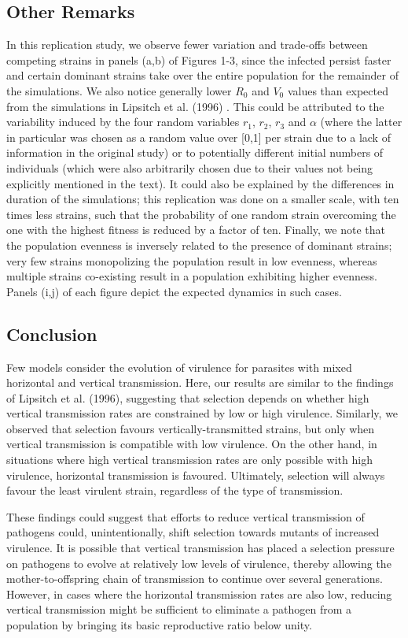 \subsection{Other Remarks}
In this replication study, we observe fewer variation and trade-offs between
competing strains in panels (a,b) of Figures 1-3, since the infected persist
faster and certain dominant strains take over the entire population for the
remainder of the simulations. We also notice generally lower $R_0$ and $V_0$
values than expected from the simulations in Lipsitch et al. (1996)
\supercite{Lipsitch:1996}. This could be attributed to the variability induced
by the four random variables $r_1$, $r_2$, $r_3$ and $\alpha$ (where the latter
in particular was chosen as a random value over [0,1] per strain due to a lack
of information in the original study) or to potentially different initial
numbers of individuals (which were also arbitrarily chosen due to their values
not being explicitly mentioned in the text). It could also be explained by the
differences in duration of the simulations; this replication was done on a
smaller scale, with ten times less strains, such that the probability of one
random strain overcoming the one with the highest fitness is reduced by a
factor of ten. Finally, we note that the population evenness is inversely
related to the presence of dominant strains; very few strains monopolizing the
population result in low evenness, whereas multiple strains co-existing result
in a population exhibiting higher evenness. Panels (i,j) of each figure depict
the expected dynamics in such cases.

\subsection{Conclusion}
Few models consider the evolution of virulence for parasites with mixed
horizontal and vertical transmission. Here, our results are similar to the
findings of Lipsitch et al. (1996)\supercite{Lipsitch:1996}, suggesting that
selection depends on whether high vertical transmission rates are constrained
by low or high virulence. Similarly, we observed that selection favours
vertically-transmitted strains, but only when vertical transmission is
compatible with low virulence. On the other hand, in situations where high
vertical transmission rates are only possible with high virulence, horizontal
transmission is favoured. Ultimately, selection will always favour the least
virulent strain, regardless of the type of transmission.

These findings could suggest that efforts to reduce vertical transmission of
pathogens could, unintentionally, shift selection towards mutants of increased
virulence. It is possible that vertical transmission has placed a selection
pressure on pathogens to evolve at relatively low levels of virulence, thereby
allowing the mother-to-offspring chain of transmission to continue over several
generations. However, in cases where the horizontal transmission rates are also
low, reducing vertical transmission might be sufficient to eliminate a pathogen
from a population by bringing its basic reproductive ratio below unity.
